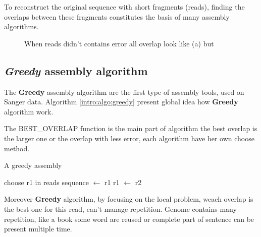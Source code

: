 \documentclass[./main.tex]{subfiles}
\begin{document}
To reconstruct the original sequence with short fragments (reads), finding the overlaps between these fragments constitutes the basis of many assembly algorithms.

\begin{figure}[ht]
    \centering
    \caption{When reads didn't contains error all overlap look like (a) but}
    \label{intro:fig:overlap}
\end{figure}


\subsection{\textit{Greedy} assembly algorithm}


The \textbf{Greedy} assembly algorithm are the first type of assembly tools, used on Sanger data. Algorithm \ref{intro:algo:greedy} present global idea how \textbf{Greedy} algorithm work.

The BEST\_OVERLAP function is the main part of algorithm the best overlap is the larger one or the overlap with less error, each algorithm have her own choose method.

\begin{algorithm}[ht]
    \caption{A greedy assembly}
    \begin{algorithmic}[1]
        \State choose r1 in reads
        \State sequence $\leftarrow$ r1
            \State {}
            \State {}
            \State r1 $\leftarrow$ r2
        \EndWhile
    \EndFunction
    \end{algorithmic}
    \label{intro:algo:greedy}
\end{algorithm}

Moreover \textbf{Greedy} algorithm, by focusing on the local problem, weach overlap is the best one for this read, can't manage repetition. Genome contains many repetition, like a book some word are reused or complete part of sentence can be present multiple time.
\end{document}
